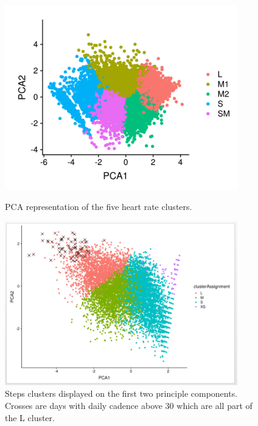 \documentclass{article}
\begin{document}
\begin{figure}
    \centering
    \begin{minipage}{0.45\textwidth}
        \centering
        \includegraphics[width=0.9\textwidth]{HRclusters.png} %
        \caption{PCA representation of the five heart rate clusters.}
        \label{fig:HRclusters}
    \end{minipage}\hfill
    \begin{minipage}{0.45\textwidth}
        \centering
        \includegraphics[width=0.9\textwidth]{FitbitClusterValidation.png} %
        \caption{Steps clusters displayed on the first two principle components. Crosses are days with daily cadence above 30 which are all part of the L cluster.}
 \label{fig:FitbitClusterValidation}
    \end{minipage}
\end{figure}
\end{document}

